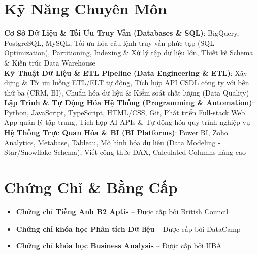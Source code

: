 \documentclass[letterpaper,11pt]{article}
\newcommand{\resumeItem}[1]{
  \item\small{
    {#1 \vspace{1pt}}
  }
}
\newcommand{\resumeItemListStart}{\begin{itemize}[leftmargin=0.15in, itemsep=2.5pt, topsep=2pt, parsep=1.5pt]}
\newcommand{\resumeItemListEnd}{\end{itemize}\vspace{2pt}}
\begin{document}
\section*{Kỹ Năng Chuyên Môn}
 \begin{itemize}[leftmargin=0.15in, label={}]
    \small{\item{
     \textbf{Cơ Sở Dữ Liệu \& Tối Ưu Truy Vấn (Databases \& SQL)}: {BigQuery, PostgreSQL, MySQL, Tối ưu hóa câu lệnh truy vấn phức tạp (SQL Optimization), Partitioning, Indexing \& Xử lý tập dữ liệu lớn, Thiết kế Schema \& Kiến trúc Data Warehouse} \\ \vspace{2pt}
     \textbf{Kỹ Thuật Dữ Liệu \& ETL Pipeline (Data Engineering \& ETL)}: {Xây dựng \& Tối ưu luồng ETL/ELT tự động, Tích hợp API CSDL công ty với bên thứ ba (CRM, BI), Chuẩn hóa dữ liệu \& Kiểm soát chất lượng (Data Quality)} \\ \vspace{2pt}
     \textbf{Lập Trình \& Tự Động Hóa Hệ Thống (Programming \& Automation)}: {Python, JavaScript, TypeScript, HTML/CSS, Git, Phát triển Full-stack Web App quản lý tập trung, Tích hợp AI APIs \& Tự động hóa quy trình nghiệp vụ} \\ \vspace{2pt}
     \textbf{Hệ Thống Trực Quan Hóa \& BI (BI Platforms)}: {Power BI, Zoho Analytics, Metabase, Tableau, Mô hình hóa dữ liệu (Data Modeling - Star/Snowflake Schema), Viết công thức DAX, Calculated Columns nâng cao}
    }}
 \end{itemize}

\section*{Chứng Chỉ \& Bằng Cấp}
        \resumeItemListStart
      \resumeItem{\textbf{Chứng chỉ Tiếng Anh B2 Aptis} -- Được cấp bởi British Council}
      \resumeItem{\textbf{Chứng chỉ khóa học Phân tích Dữ liệu} -- Được cấp bởi DataCamp}
      \resumeItem{\textbf{Chứng chỉ khóa học Business Analysis} -- Được cấp bởi IIBA}
      \resumeItemListEnd

\end{document}
